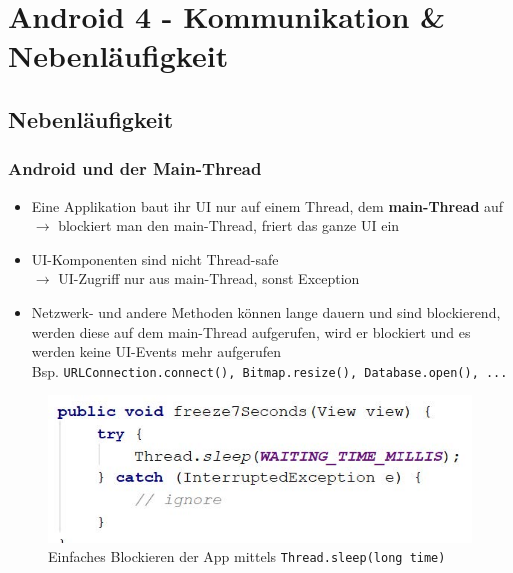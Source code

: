 \documentclass[a4paper]{article}
\begin{document}
\section{Android 4 - Kommunikation \& Nebenläufigkeit}

	\subsection{Nebenläufigkeit}
	
		\subsubsection{Android und der Main-Thread}
	
		\begin{itemize}
			\item Eine Applikation baut ihr UI nur auf einem Thread, dem \textbf{main-Thread} auf\\
			$\rightarrow$ blockiert man den main-Thread, friert das ganze UI ein
			\item UI-Komponenten sind nicht Thread-safe\\
			$\rightarrow$ UI-Zugriff nur aus main-Thread, sonst Exception
			\item Netzwerk- und andere Methoden können lange dauern und sind blockierend, werden diese auf dem main-Thread aufgerufen, wird er blockiert und es werden keine UI-Events mehr aufgerufen\\
			Bsp. \texttt{URLConnection.connect(), Bitmap.resize(), Database.open(), ... }
		\end{itemize}
	
		\begin{figure}[htb!]
			\centering
			\includegraphics[width=.7\textwidth]{img/thread_sleep.jpg}
			\caption{Einfaches Blockieren der App mittels \texttt{Thread.sleep(long time)}}
		\end{figure}
	
\end{document}
